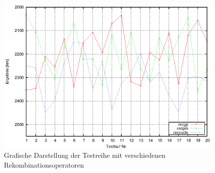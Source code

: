 \begin{figure}
  \centering
  \includegraphics[width=1.0\textwidth]{../images/aufgabeE-plot}
  \caption{Grafische Darstellung der Testreihe mit verschiedenen Rekombinationsoperatoren}
  \label{fig:aufgabeE-plot}
\end{figure}